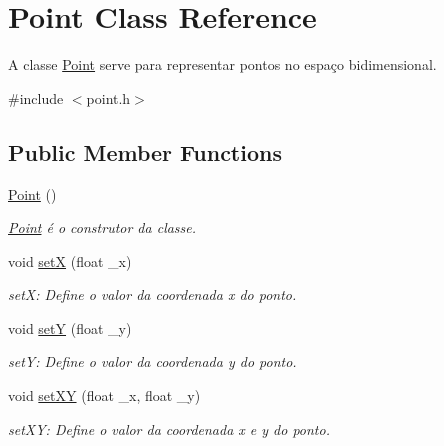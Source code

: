 \hypertarget{class_point}{}\section{Point Class Reference}
\label{class_point}


A classe \mbox{\hyperlink{class_point}{Point}} serve para representar pontos no espaço bidimensional.  




{\ttfamily \#include $<$point.\+h$>$}

\subsection*{Public Member Functions}
\begin{DoxyCompactItemize}
\item 
\mbox{\label{class_point_ad92f2337b839a94ce97dcdb439b4325a}} 
\mbox{\hyperlink{class_point_ad92f2337b839a94ce97dcdb439b4325a}{Point}} ()
\begin{DoxyCompactList}\small\item\em \mbox{\hyperlink{class_point}{Point}} é o construtor da classe. \end{DoxyCompactList}\item 
void \mbox{\hyperlink{class_point_a428a1676e2fdec6753c42011a1d59d18}{setX}} (float \+\_\+x)
\begin{DoxyCompactList}\small\item\em setX\+: Define o valor da coordenada x do ponto. \end{DoxyCompactList}\item 
void \mbox{\hyperlink{class_point_a9868c4601b0ea0c2d0de20fe41ee0e49}{setY}} (float \+\_\+y)
\begin{DoxyCompactList}\small\item\em setY\+: Define o valor da coordenada y do ponto. \end{DoxyCompactList}\item 
void \mbox{\hyperlink{class_point_ab5385c6d9bfa841e641e4709fc9f14cc}{set\+XY}} (float \+\_\+x, float \+\_\+y)
\begin{DoxyCompactList}\small\item\em set\+XY\+: Define o valor da coordenada x e y do ponto. \end{DoxyCompactList}\item 
\mbox{\label{class_point_a9aa94b8fd07296e64d304ef3750db113}} 

\end{DoxyCompactItemize}
